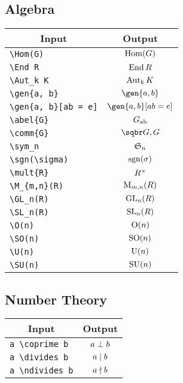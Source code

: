 \documentclass[a4paper, 11pt]{article}
\begin{document}
\subsection{Algebra}
\begin{center}
  \begin{tabular}{lc} \toprule
    \multicolumn{1}{c}{Input} & Output               \\\midrule
    \verb|\Hom(G)|   & $\operatorname{Hom}(G)$            \\
    \verb|\End R|   & $\operatorname{End} R$             \\
    \verb|\Aut_k K|   & $\operatorname{Aut}_k K$           \\
    \verb|\gen{a, b}|   & $\gen{a, b}$         \\
    \verb|\gen{a, b}[ab = e]|   & $\gen{a, b}[ab = e]$ \\
    \verb|\abel{G}|   & $G_{\mathrm{ab}}$           \\
    \verb|\comm{G}|   & $\comm{G}$           \\
    \verb|\sym_n|   & $\mathfrak{S}_n$             \\
    \verb|\sgn(\sigma)|   & $\operatorname{sgn}(\sigma)$       \\
    \verb|\mult{R}|   & $R^{\times}$           \\
    \verb|\M_{m,n}(R)|   & $\operatorname{M}_{m,n}(R)$        \\
    \verb|\GL_n(R)|   & $\operatorname{GL}_n(R)$           \\
    \verb|\SL_n(R)|   & $\operatorname{SL}_n(R)$           \\
    \verb|\O(n)|   & $\operatorname{O}(n)$              \\
    \verb|\SO(n)|   & $\operatorname{SO}(n)$             \\
    \verb|\U(n)|   & $\operatorname{U}(n)$              \\
    \verb|\SU(n)|   & $\operatorname{SU}(n)$             \\
    \bottomrule
  \end{tabular}
\end{center}

\subsection{Number Theory}
\begin{center}
  \begin{tabular}{lc} \toprule
    \multicolumn{1}{c}{Input} & Output          \\\midrule
    \verb|a \coprime b|   & $a \mathrel{\bot} b$  \\
    \verb|a \divides b|   & $a \mid b$  \\
    \verb|a \ndivides b|   & $a \nmid b$ \\
    \bottomrule
  \end{tabular}
\end{center}
\end{document}
